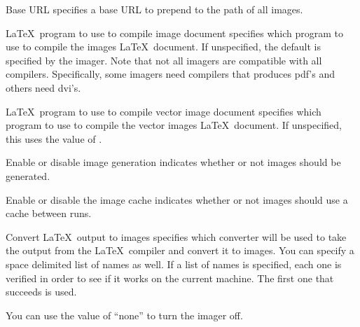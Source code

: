 \begin{configuration}{Base URL}
specifies a base URL to prepend to the path of all images.
\end{configuration}

\begin{configuration}{\LaTeX\ program to use to compile image document}
specifies which program to use to compile the images \LaTeX\ document. If
unspecified, the default is specified by the imager. Note that not all imagers
are compatible with all compilers. Specifically, some imagers need compilers
that produces pdf's and others need dvi's.
\end{configuration}

\begin{configuration}{\LaTeX\ program to use to compile vector image document}
specifies which program to use to compile the vector images \LaTeX\ document. If
unspecified, this uses the value of .
\end{configuration}

\begin{configuration}{Enable or disable image generation}
indicates whether or not images should be generated.
\end{configuration}

\begin{configuration}{Enable or disable the image cache}
indicates whether or not images should use a cache between runs.
\end{configuration}

\begin{configuration}{Convert \LaTeX\ output to images}
specifies which converter will be used to take the output from the
\LaTeX\ compiler and convert it to images.  You can specify a space
delimited list of names as well.  If a list of names is specified,
each one is verified in order to see if it works on the current machine.
The first one that succeeds is used.

You can use the value of ``none'' to turn the imager off.
\end{configuration}

